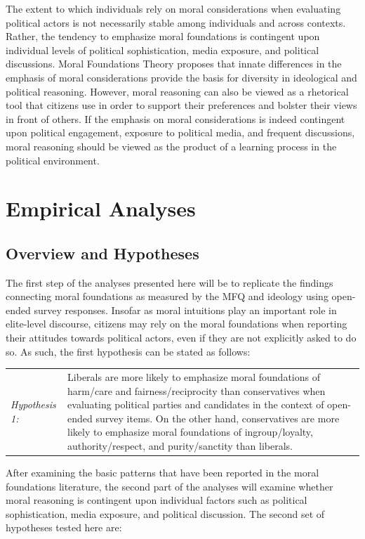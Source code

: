 \documentclass[12pt]{article}
\begin{document}
The extent to which individuals rely on moral considerations when evaluating political actors is not necessarily stable among individuals and across contexts. Rather, the tendency to emphasize moral foundations is contingent upon individual levels of political sophistication, media exposure, and political discussions. Moral Foundations Theory proposes that innate differences in the emphasis of moral considerations provide the basis for diversity in ideological and political reasoning. However, moral reasoning can also be viewed as a rhetorical tool that citizens use in order to support their preferences and bolster their views in front of others. If the emphasis on moral considerations is indeed contingent upon political engagement, exposure to political media, and frequent discussions, moral reasoning should be viewed as the product of a learning process in the political environment.


\section{Empirical Analyses}

\subsection{Overview and Hypotheses}

The first step of the analyses presented here will be to replicate the findings connecting moral foundations as measured by the MFQ and ideology using open-ended survey responses. Insofar as moral intuitions play an important role in elite-level discourse, citizens may rely on the moral foundations when reporting their attitudes towards political actors, even if they are not explicitly asked to do so. As such, the first hypothesis can be stated as follows:

\vspace{0.3cm}
\begin{tabular}{lp{12cm}}
\textsl{Hypothesis 1:} & Liberals are more likely to emphasize moral foundations of harm/care and fairness/reciprocity  than conservatives when evaluating political parties and candidates in the context of open-ended survey items. On the other hand, conservatives are more likely to emphasize moral foundations of ingroup/loyalty, authority/respect, and purity/sanctity than liberals.
\end{tabular}
\vspace{0.5cm}

After examining the basic patterns that have been reported in the moral foundations literature, the second part of the analyses will examine whether moral reasoning is contingent upon individual factors such as political sophistication, media exposure, and political discussion. The second set of hypotheses tested here are:
\end{document}
